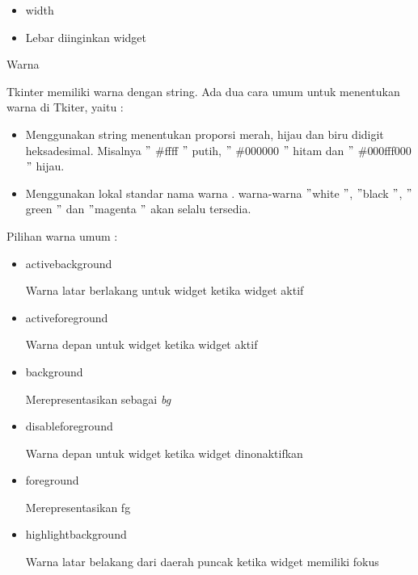 \begin{itemize}
\begin{itemize}
\noindent 
\item width \par
\noindent 
\item Lebar diinginkan widget\end{itemize}
 \par
\noindent 
Warna \par
\noindent 
Tkinter memiliki warna dengan string. Ada dua cara umum untuk menentukan warna di Tkiter, yaitu : \par
\noindent 
\begin{itemize}
\item Menggunakan string menentukan proporsi merah, hijau dan biru didigit heksadesimal. Misalnya  $ " $ $  \#  $ffff $ " $ putih,  $ " $ $  \#  $000000 $ " $ hitam dan  $ " $ $  \#  $000fff000 $ " $ hijau. \par
\noindent 
\item Menggunakan lokal standar nama warna . warna-warna  $ " $white $ " $, $ " $black $ " $,  $ " $green $ " $ dan  $ " $magenta $ " $ akan selalu tersedia.\end{itemize}
 \par
\vspace{12pt}
Pilihan warna umum : \par
\noindent 
\begin{itemize}
\item activebackground \par
Warna latar berlakang untuk widget ketika widget aktif \par
\noindent 
\item activeforeground \par
Warna depan untuk widget ketika widget aktif \par
\noindent 
\item background \par
Merepresentasikan sebagai \textit{bg} \par
\noindent 
\item disableforeground \par
Warna depan untuk widget ketika widget dinonaktifkan \par
\noindent 
\item foreground \par
Merepresentasikan fg \par
\noindent 
\item highlightbackground \par
Warna latar belakang dari daerah puncak ketika widget memiliki fokus \par

\end{itemize}
\end{itemize}
